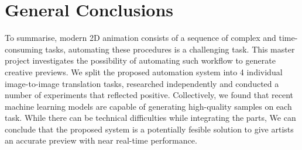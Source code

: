 \chapter{General Conclusions}
\label{chapterlabel8}

To summarise, modern 2D animation consists of a sequence of complex and time-consuming tasks, automating these procedures is a challenging task. This master project investigates the possibility of automating such workflow to generate creative previews. We split the proposed automation system into 4 individual image-to-image translation tasks, researched independently and conducted a number of experiments that reflected positive. Collectively, we found that recent machine learning models are capable of generating high-quality samples on each task. While there can be technical difficulties while integrating the parts, We can conclude that the proposed system is a potentially fesible solution to give artists an accurate preview with near real-time performance.




